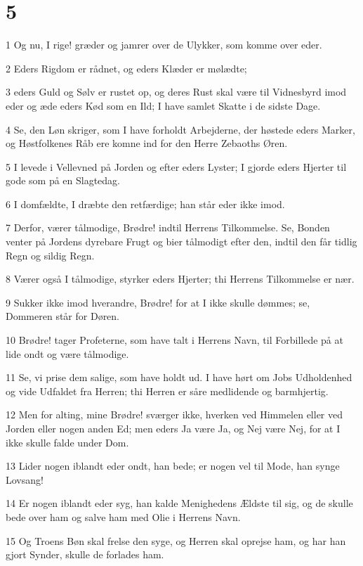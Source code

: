 \chapter{5}

\par 1 Og nu, I rige! græder og jamrer over de Ulykker, som komme over eder.
\par 2 Eders Rigdom er rådnet, og eders Klæder er mølædte;
\par 3 eders Guld og Sølv er rustet op, og deres Rust skal være til Vidnesbyrd imod eder og æde eders Kød som en Ild; I have samlet Skatte i de sidste Dage.
\par 4 Se, den Løn skriger, som I have forholdt Arbejderne, der høstede eders Marker, og Høstfolkenes Råb ere komne ind for den Herre Zebaoths Øren.
\par 5 I levede i Vellevned på Jorden og efter eders Lyster; I gjorde eders Hjerter til gode som på en Slagtedag.
\par 6 I domfældte, I dræbte den retfærdige; han står eder ikke imod.
\par 7 Derfor, værer tålmodige, Brødre! indtil Herrens Tilkommelse. Se, Bonden venter på Jordens dyrebare Frugt og bier tålmodigt efter den, indtil den får tidlig Regn og sildig Regn.
\par 8 Værer også I tålmodige, styrker eders Hjerter; thi Herrens Tilkommelse er nær.
\par 9 Sukker ikke imod hverandre, Brødre! for at I ikke skulle dømmes; se, Dommeren står for Døren.
\par 10 Brødre! tager Profeterne, som have talt i Herrens Navn, til Forbillede på at lide ondt og være tålmodige.
\par 11 Se, vi prise dem salige, som have holdt ud. I have hørt om Jobs Udholdenhed og vide Udfaldet fra Herren; thi Herren er såre medlidende og barmhjertig.
\par 12 Men for alting, mine Brødre! sværger ikke, hverken ved Himmelen eller ved Jorden eller nogen anden Ed; men eders Ja være Ja, og Nej være Nej, for at I ikke skulle falde under Dom.
\par 13 Lider nogen iblandt eder ondt, han bede; er nogen vel til Mode, han synge Lovsang!
\par 14 Er nogen iblandt eder syg, han kalde Menighedens Ældste til sig, og de skulle bede over ham og salve ham med Olie i Herrens Navn.
\par 15 Og Troens Bøn skal frelse den syge, og Herren skal oprejse ham, og har han gjort Synder, skulle de forlades ham.
